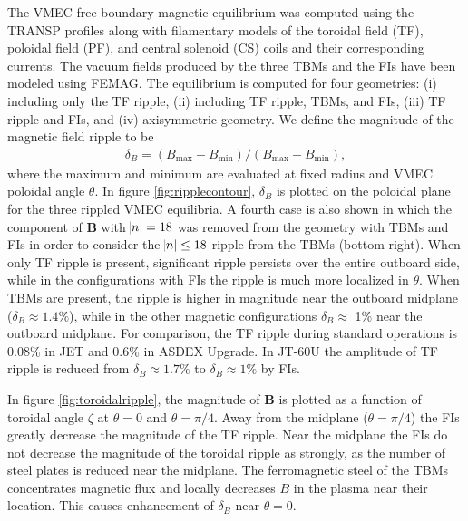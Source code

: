 \documentclass[aip, pop, preprint]{revtex4-1}
\numberwithin{figure}{section}
\numberwithin{equation}{section}
\begin{document}
\FloatBarrier

The VMEC free boundary \cite{Hirshman1986a} magnetic equilibrium was computed using the TRANSP profiles along with filamentary models of the toroidal field (TF), poloidal field (PF), and central solenoid (CS) coils and their corresponding currents. The vacuum fields produced by the three TBMs and the FIs have been modeled using FEMAG.\cite{Shinohara2009} The equilibrium is computed for four geometries: (i) including only the TF ripple, (ii) including TF ripple, TBMs, and FIs, (iii) TF ripple and FIs, and (iv) axisymmetric geometry. We define the magnitude of the magnetic field ripple to be
\begin{gather}
\delta_B = (B_{\mathrm{max}}-B_{\mathrm{min}})/(B_{\mathrm{max}} + B_{\mathrm{min}}), 
\end{gather}
where the maximum and minimum are evaluated at fixed radius and VMEC poloidal angle $\theta$. In figure \ref{fig:ripplecontour}, $\delta_B$ is plotted on the poloidal plane for the three rippled VMEC equilibria. A fourth case is also shown in which the component of $\bm{B}$ with $\abs{ n } = 18$ was removed from the geometry with TBMs and FIs in order to consider the $\abs{ n } \leq 18$ ripple from the TBMs (bottom right). When only TF ripple is present, significant ripple persists over the entire outboard side, while in the configurations with FIs the ripple is much more localized in $\theta$. When TBMs are present, the ripple is higher in magnitude near the outboard midplane ($\delta_B \approx 1.4\%$), while in the other magnetic configurations $\delta_B \approx$ 1\% near the outboard midplane. For comparison, the TF ripple during standard operations is $0.08\%$ in JET \cite{DeVries2008b} and $0.6\%$ in ASDEX Upgrade.\cite{Martitsch2016} In JT-60U the amplitude of TF ripple is reduced from $\delta_B \approx 1.7\%$ to $\delta_B \approx 1\%$ by FIs.\cite{Urano2007}

In figure \ref{fig:toroidalripple}, the magnitude of $\bm{B}$ is plotted as a function of toroidal angle $\zeta$ at $\theta = 0$ and $\theta = \pi/4$. Away from the midplane ($\theta = \pi/4$) the FIs greatly decrease the magnitude of the TF ripple. Near the midplane the FIs do not decrease the magnitude of the toroidal ripple as strongly, as the number of steel plates is reduced near the midplane.\cite{Shinohara2009} The ferromagnetic steel of the TBMs concentrates magnetic flux and locally decreases $B$ in the plasma near their location. This causes enhancement of $\delta_B$  near $\theta = 0$. 
\FloatBarrier
\end{document}
